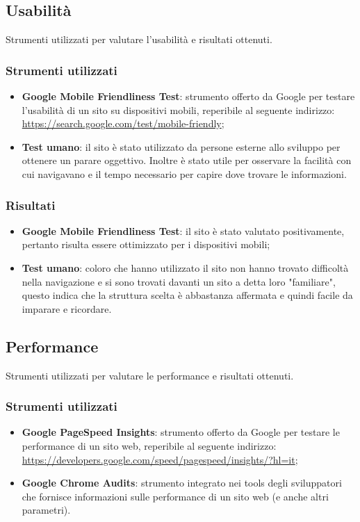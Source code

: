\documentclass[12pt]{article}
\begin{document}
	\subsection{Usabilità}
	Strumenti utilizzati per valutare l'usabilità e risultati ottenuti.
	\subsubsection{Strumenti utilizzati}
		\begin{itemize}
			\item \textbf{Google Mobile Friendliness Test}: strumento offerto da Google per testare l'usabilità di un sito su dispositivi mobili, reperibile al seguente indirizzo: \url{https://search.google.com/test/mobile-friendly};
			\item \textbf{Test umano}: il sito è stato utilizzato da persone esterne allo sviluppo per ottenere un parare oggettivo. Inoltre è stato utile per osservare la facilità con cui navigavano e il tempo necessario per capire dove trovare le informazioni.
		\end{itemize}
	\subsubsection{Risultati}
		\begin{itemize}
			\item \textbf{Google Mobile Friendliness Test}: il sito è stato valutato positivamente, pertanto risulta essere ottimizzato per i dispositivi mobili;
			\item \textbf{Test umano}: coloro che hanno utilizzato il sito non hanno trovato difficoltà nella navigazione e si sono trovati davanti un sito a detta loro "familiare", questo indica che la struttura scelta è abbastanza affermata e quindi facile da imparare e ricordare.
		\end{itemize}
	\subsection{Performance}
	Strumenti utilizzati per valutare le performance e risultati ottenuti.
	\subsubsection{Strumenti utilizzati}
		\begin{itemize}
			\item \textbf{Google PageSpeed Insights}: strumento offerto da Google per testare le performance di un sito web, reperibile al seguente indirizzo: \url{https://developers.google.com/speed/pagespeed/insights/?hl=it};
			\item \textbf{Google Chrome Audits}: strumento integrato nei tools degli sviluppatori che fornisce informazioni sulle performance di un sito web (e anche altri parametri).
		\end{itemize}
\end{document}

